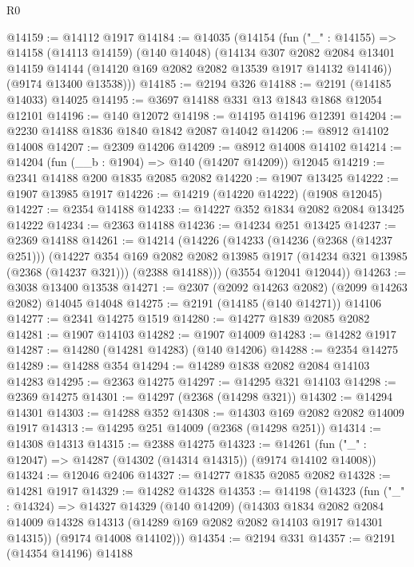 \begin{lexlean}{R0}
\begin{coremodule}
@14159 := @14112 @1917
@14184 := @14035
    (@14154
      (fun ("_" : @14155) =>
      @14158
        (@14113 @14159)
        (@140 @14048)
        (@14134
          @307
          @2082
          @2084
          @13401
          @14159
          @14144
          (@14120 @169 @2082 @2082 @13539 @1917 @14132 @14146))
        (@9174 @13400 @13538)))
@14185 := @2194 @326
@14188 := @2191 (@14185 @14033) @14025
@14195 := @3697 @14188 @331 @13 @1843 @1868 @12054 @12101
@14196 := @140 @12072
@14198 := @14195 @14196 @12391
@14204 := @2230 @14188 @1836 @1840 @1842 @2087 @14042
@14206 := @8912 @14102 @14008
@14207 := @2309 @14206
@14209 := @8912 @14008 @14102
@14214 := @14204 (fun (__b : @1904) => @140 (@14207 @14209)) @12045
@14219 := @2341 @14188 @200 @1835 @2085 @2082
@14220 := @1907 @13425
@14222 := @1907 @13985 @1917
@14226 := @14219 (@14220 @14222) (@1908 @12045)
@14227 := @2354 @14188
@14233 := @14227 @352 @1834 @2082 @2084 @13425 @14222
@14234 := @2363 @14188
@14236 := @14234 @251 @13425
@14237 := @2369 @14188
@14261 := @14214
    (@14226
      (@14233
        (@14236 (@2368 (@14237 @251)))
        (@14227
          @354
          @169
          @2082
          @2082
          @13985
          @1917
          (@14234 @321 @13985 (@2368 (@14237 @321)))
          (@2388 @14188)))
      (@3554 @12041 @12044))
@14263 := @3038 @13400 @13538
@14271 := @2307 (@2092 @14263 @2082) (@2099 @14263 @2082) @14045 @14048
@14275 := @2191 (@14185 (@140 @14271)) @14106
@14277 := @2341 @14275 @1519
@14280 := @14277 @1839 @2085 @2082
@14281 := @1907 @14103
@14282 := @1907 @14009
@14283 := @14282 @1917
@14287 := @14280 (@14281 @14283) (@140 @14206)
@14288 := @2354 @14275
@14289 := @14288 @354
@14294 := @14289 @1838 @2082 @2084 @14103 @14283
@14295 := @2363 @14275
@14297 := @14295 @321 @14103
@14298 := @2369 @14275
@14301 := @14297 (@2368 (@14298 @321))
@14302 := @14294 @14301
@14303 := @14288 @352
@14308 := @14303 @169 @2082 @2082 @14009 @1917
@14313 := @14295 @251 @14009 (@2368 (@14298 @251))
@14314 := @14308 @14313
@14315 := @2388 @14275
@14323 := @14261 (fun ("_" : @12047) => @14287 (@14302 (@14314 @14315)) (@9174 @14102 @14008))
@14324 := @12046 @2406
@14327 := @14277 @1835 @2085 @2082
@14328 := @14281 @1917
@14329 := @14282 @14328
@14353 := @14198
    (@14323
      (fun ("_" : @14324) =>
      @14327
        @14329
        (@140 @14209)
        (@14303
          @1834
          @2082
          @2084
          @14009
          @14328
          @14313
          (@14289 @169 @2082 @2082 @14103 @1917 @14301 @14315))
        (@9174 @14008 @14102)))
@14354 := @2194 @331
@14357 := @2191 (@14354 @14196) @14188

\end{coremodule}
\end{lexlean}
